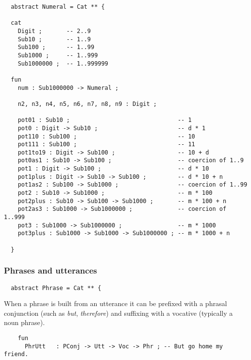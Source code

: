 \documentclass[11pt,a4paper]{article}
\newcommand{\commOut}[1]{}
\begin{document}
\begin{verbatim}
  abstract Numeral = Cat ** {
  
  cat 
    Digit ;       -- 2..9
    Sub10 ;       -- 1..9
    Sub100 ;      -- 1..99
    Sub1000 ;     -- 1..999
    Sub1000000 ;  -- 1..999999
  
  fun 
    num : Sub1000000 -> Numeral ;
  
    n2, n3, n4, n5, n6, n7, n8, n9 : Digit ;
  
    pot01 : Sub10 ;                               -- 1
    pot0 : Digit -> Sub10 ;                       -- d * 1
    pot110 : Sub100 ;                             -- 10
    pot111 : Sub100 ;                             -- 11
    pot1to19 : Digit -> Sub100 ;                  -- 10 + d
    pot0as1 : Sub10 -> Sub100 ;                   -- coercion of 1..9
    pot1 : Digit -> Sub100 ;                      -- d * 10
    pot1plus : Digit -> Sub10 -> Sub100 ;         -- d * 10 + n
    pot1as2 : Sub100 -> Sub1000 ;                 -- coercion of 1..99
    pot2 : Sub10 -> Sub1000 ;                     -- m * 100
    pot2plus : Sub10 -> Sub100 -> Sub1000 ;       -- m * 100 + n
    pot2as3 : Sub1000 -> Sub1000000 ;             -- coercion of 1..999
    pot3 : Sub1000 -> Sub1000000 ;                -- m * 1000
    pot3plus : Sub1000 -> Sub1000 -> Sub1000000 ; -- m * 1000 + n
  
  }
\end{verbatim}

\commOut{Produced by 
gfdoc - a rudimentary GF document generator.
(c) Aarne Ranta (\htmladdnormallink{aarne@cs.chalmers.se}{mailto:aarne@cs.chalmers.se}) 2002 under GNU GPL.}


\commOut{Produced by 
gfdoc - a rudimentary GF document generator.
(c) Aarne Ranta (\htmladdnormallink{aarne@cs.chalmers.se}{mailto:aarne@cs.chalmers.se}) 2002 under GNU GPL.}


\subsubsection{Phrases and utterances}
\begin{verbatim}
  abstract Phrase = Cat ** {
\end{verbatim}

When a phrase is built from an utterance it can be prefixed
with a phrasal conjunction (such as \textit{but}, \textit{therefore})
and suffixing with a vocative (typically a noun phrase).

\begin{verbatim}
    fun
      PhrUtt   : PConj -> Utt -> Voc -> Phr ; -- But go home my friend.
\end{verbatim}
\end{document}
